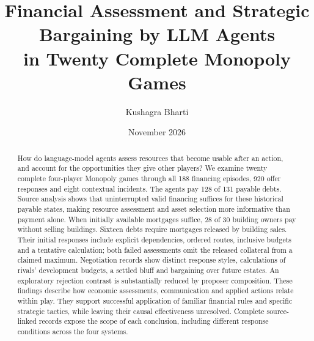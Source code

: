 \documentclass[10pt,twocolumn,letterpaper]{article}
\title{Financial Assessment and Strategic Bargaining by LLM Agents\\in Twenty Complete Monopoly Games}
\author{Kushagra Bharti}
\date{November 2026}
\begin{document}
\maketitle
\begin{abstract}
How do language-model agents assess resources that become usable after an action, and account for the opportunities they give other players? We examine twenty complete four-player Monopoly games through all 188 financing episodes, 920 offer responses and eight contextual incidents. The agents pay 128 of 131 payable debts. Source analysis shows that uninterrupted valid financing suffices for these historical payable states, making resource assessment and asset selection more informative than payment alone. When initially available mortgages suffice, 28 of 30 building owners pay without selling buildings. Sixteen debts require mortgages released by building sales. Their initial responses include explicit dependencies, ordered routes, inclusive budgets and a tentative calculation; both failed assessments omit the released collateral from a claimed maximum. Negotiation records show distinct response styles, calculations of rivals' development budgets, a settled bluff and bargaining over future estates. An exploratory rejection contrast is substantially reduced by proposer composition. These findings describe how economic assessments, communication and applied actions relate within play. They support successful application of familiar financial rules and specific strategic tactics, while leaving their causal effectiveness unresolved. Complete source-linked records expose the scope of each conclusion, including different response conditions across the four systems.
\end{abstract}

\label{main-end}


\clearpage\onecolumn\appendix

\end{document}
